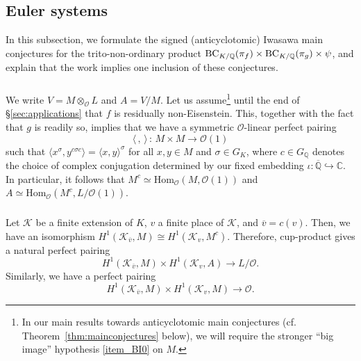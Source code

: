 \documentclass{amsart}
\numberwithin{equation}{section}
\newcommand{\bb}{\mathbb}
\newcommand{\QQ}{\mathbb{Q}}
\newcommand{\Hom}{\mathrm{Hom}}
\begin{document}
\subsection{Euler systems}
\label{subsec:ES}

In this subsection, we formulate the signed (anticyclotomic) Iwasawa main conjectures for the trito-non-ordinary product ${\rm BC}_{K/\QQ}(\pi_f)\times {\rm BC}_{K/\QQ}(\pi_g)\times \psi$, and explain that the work \cite{JNS} implies one inclusion of these conjectures.

\subsubsection{} We write $V=M\otimes_{\mathcal{O}}L$ and $A=V/M$. Let us assume\footnote{In our main results towards anticyclotomic main conjectures (cf. Theorem~\ref{thm:mainconjectures} below), we will require the stronger ``big image'' hypothesis \eqref{item_BI0} on $M$.} until the end of \S\ref{sec:applications} that $f$ is residually non-Eisenstein. This, together with the fact that $g$ is readily so, implies that we have a symmetric $\mathcal{O}$-linear perfect pairing
\[
\langle \, , \, \rangle \, : \, M \times M \longrightarrow \mathcal{O}(1)
\]
such that $\langle x^\sigma,y^{c\sigma c}\rangle=\langle x,y\rangle^\sigma$ for all $x,y\in M$ and $\sigma\in G_K$, where $c\in G_{\bb{Q}}$ denotes the choice of complex conjugation determined by our fixed embedding $\iota:\overline{\bb{Q}}\hookrightarrow \bb{C}$. In particular, it follows that $M^c\simeq \Hom_{\mathcal{O}}(M,\mathcal{O}(1))$ and $A\simeq \Hom_{\mathcal{O}}(M^c,L/\mathcal{O}(1))$.

\subsubsection{} Let $\mathcal{K}$ be a finite extension of $K$, $v$ a finite place of $\mathcal{K}$, and $\overline{v}=c(v)$. Then, we have an isomorphism $H^1(\mathcal{K}_{\overline{v}},M)\cong H^1(\mathcal{K}_v,M^c)$. Therefore, cup-product gives a natural perfect pairing
\begin{equation*}
    H^1(\mathcal{K}_{\overline{v}},M)\times H^1(\mathcal{K}_v,A) \longrightarrow L/\mathcal{O}.
\end{equation*}
Similarly, we have a perfect pairing
\begin{equation*}
    H^1(\mathcal{K}_{\overline{v}},M)\times H^1(\mathcal{K}_v,M) \longrightarrow\mathcal{O}.
\end{equation*}
\end{document}
